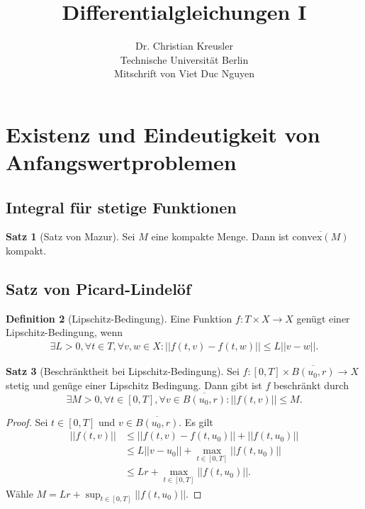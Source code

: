 \documentclass[a4paper]{article}
\theoremstyle{definition}
\newtheorem{theorem}{Satz}
\newtheorem{definition}[theorem]{Definition}
\begin{document}
\title{Differentialgleichungen I}
\author{Dr. Christian Kreusler \\ Technische Universität Berlin \\ Mitschrift von Viet Duc Nguyen}
\maketitle
\newpage
\tableofcontents
\newpage




\section{Existenz und Eindeutigkeit von Anfangswertproblemen}

\subsection{Integral für stetige Funktionen}
\begin{theorem}[Satz von Mazur]\label{theorem:mazur}
Sei $M$ eine kompakte Menge. Dann ist $\overline{\mathrm{convex}(M)}$ kompakt.
    \end{theorem}

\subsection{Satz von Picard-Lindelöf}

\begin{definition}[Lipschitz-Bedingung]
    Eine Funktion $f: T \times X \to X$ genügt einer Lipschitz-Bedingung, wenn 
    \begin{align*}
        \exists L > 0, \forall t \in T, \forall v,w \in X: ||f(t,v) - f(t,w)|| \leq L||v - w||.
    \end{align*}
\end{definition}

\begin{theorem}[Beschränktheit bei Lipschitz-Bedingung]
\label{theorem:lipschitz_bounded}
Sei $f:[0,T] \times \overline{B(u_0,r)} \to X$ stetig und genüge einer Lipschitz Bedingung. Dann gibt ist $f$ beschränkt durch
\[
    \exists M > 0, \forall t\in [0,T],  \forall v \in \overline{B(u_0,r)}: ||f(t,v)|| \leq M.
\]
\end{theorem}
\begin{proof}
Sei $t \in [0,T]$ und $v \in \overline{B(u_0,r)}$. Es gilt
\begin{align*}
    ||f(t,v)|| &\leq ||f(t,v) - f(t,u_0)|| + ||f(t,u_0)|| \\
    &\leq L||v-u_0|| + \max_{t \in [0,T]} ||f(t,u_0)|| \\ 
    &\leq Lr + \max_{t \in [0,T]} ||f(t,u_0)||.
\end{align*}
Wähle $M = Lr + \sup_{t \in [0,T]} ||f(t,u_0)||$. 
\end{proof}
\end{document}
